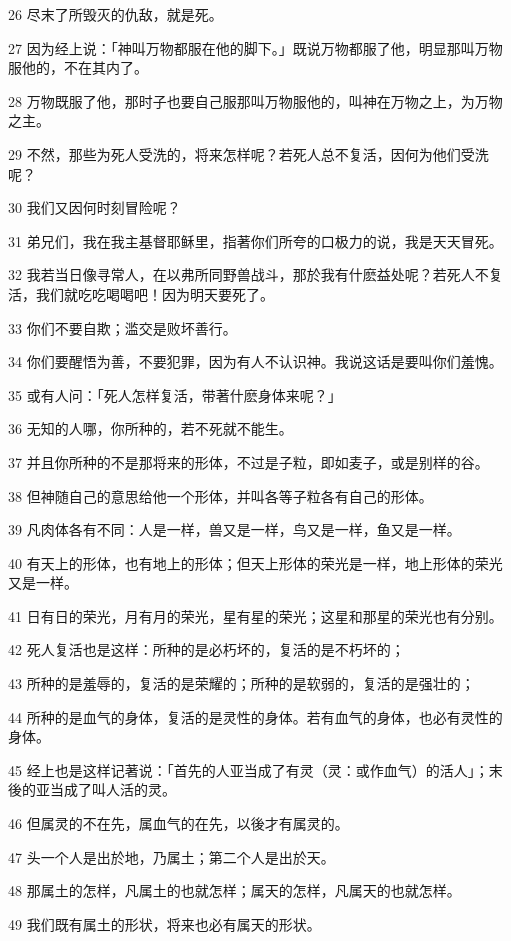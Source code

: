 \par 26 尽末了所毁灭的仇敌，就是死。
\par 27 因为经上说：「神叫万物都服在他的脚下。」既说万物都服了他，明显那叫万物服他的，不在其内了。
\par 28 万物既服了他，那时子也要自己服那叫万物服他的，叫神在万物之上，为万物之主。
\par 29 不然，那些为死人受洗的，将来怎样呢？若死人总不复活，因何为他们受洗呢？
\par 30 我们又因何时刻冒险呢？
\par 31 弟兄们，我在我主基督耶稣里，指著你们所夸的口极力的说，我是天天冒死。
\par 32 我若当日像寻常人，在以弗所同野兽战斗，那於我有什麽益处呢？若死人不复活，我们就吃吃喝喝吧！因为明天要死了。
\par 33 你们不要自欺；滥交是败坏善行。
\par 34 你们要醒悟为善，不要犯罪，因为有人不认识神。我说这话是要叫你们羞愧。
\par 35 或有人问：「死人怎样复活，带著什麽身体来呢？」
\par 36 无知的人哪，你所种的，若不死就不能生。
\par 37 并且你所种的不是那将来的形体，不过是子粒，即如麦子，或是别样的谷。
\par 38 但神随自己的意思给他一个形体，并叫各等子粒各有自己的形体。
\par 39 凡肉体各有不同：人是一样，兽又是一样，鸟又是一样，鱼又是一样。
\par 40 有天上的形体，也有地上的形体；但天上形体的荣光是一样，地上形体的荣光又是一样。
\par 41 日有日的荣光，月有月的荣光，星有星的荣光；这星和那星的荣光也有分别。
\par 42 死人复活也是这样：所种的是必朽坏的，复活的是不朽坏的；
\par 43 所种的是羞辱的，复活的是荣耀的；所种的是软弱的，复活的是强壮的；
\par 44 所种的是血气的身体，复活的是灵性的身体。若有血气的身体，也必有灵性的身体。
\par 45 经上也是这样记著说：「首先的人亚当成了有灵（灵：或作血气）的活人」；末後的亚当成了叫人活的灵。
\par 46 但属灵的不在先，属血气的在先，以後才有属灵的。
\par 47 头一个人是出於地，乃属土；第二个人是出於天。
\par 48 那属土的怎样，凡属土的也就怎样；属天的怎样，凡属天的也就怎样。
\par 49 我们既有属土的形状，将来也必有属天的形状。

